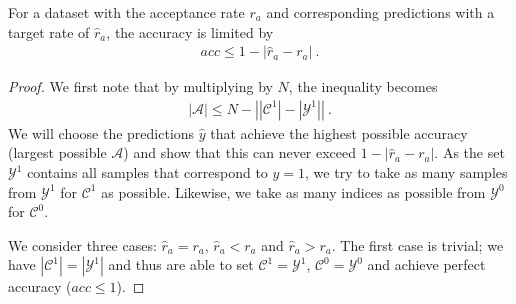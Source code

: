 \begin{theorem}
  For a dataset with the acceptance rate $r_a$ and corresponding predictions with a target rate of $\hat{r}_a$,
  the accuracy is limited by
  \begin{align}
    \mathit{acc} \leq 1 - \left| \hat{r}_a -r_a \right|~.
  \end{align}
\end{theorem}
\begin{proof}
  We first note that by multiplying by $N$, the inequality becomes
  \begin{align}
    |\mathcal{A}| \leq N - \left| |\mathcal{C}^1| -|\mathcal{Y}^1| \right|~.
  \end{align}
  We will choose the predictions $\hat{y}$ that achieve the highest possible accuracy (largest possible $\mathcal{A}$)
  and show that this can never exceed $1 - \left| \hat{r}_a -r_a \right|$.
  As the set $\mathcal{Y}^1$ contains all samples that correspond to $y=1$,
  we try to take as many samples from $\mathcal{Y}^1$ for $\mathcal{C}^1$ as possible.
  Likewise, we take as many indices as possible from $\mathcal{Y}^0$ for $\mathcal{C}^0$.

  We consider three cases: $\hat{r}_a = r_a$, $\hat{r}_a < r_a$ and $\hat{r}_a > r_a$.
  The first case is trivial;
  we have $\left|\mathcal{C}^1\right| = \left|\mathcal{Y}^1\right|$ and thus
  are able to set $\mathcal{C}^1 = \mathcal{Y}^1$, $\mathcal{C}^0 = \mathcal{Y}^0$ and achieve perfect accuracy ($\mathit{acc} \leq 1$).


\end{proof}
